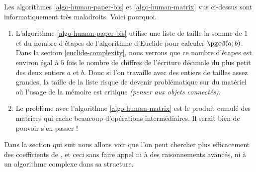 Les algorithmes \ref{algo-human-paper-bis} et \ref{algo-human-matrix} vus ci-dessus sont informatiquement très maladroits. Voici pourquoi.

\begin{enumerate}
	\item L'algorithme \ref{algo-human-paper-bis} utilise une liste de taille la somme de $1$ et du nombre d'étapes de l'algo\-rithme d'Euclide pour calculer $\pgcd(a ; b)$.
	Dans la section \ref{euclide-complexity}, nous verrons que ce nombre d'étapes est environ égal à $5$ fois le nombre de chiffres de l'écriture décimale du plus petit des deux entiers $a$ et $b$.
	Donc si l'on travaille avec des entiers de tailles assez grandes, la taille de la liste risque de devenir problématique sur du matériel où l'usage de la mémoire est critique \emph{(penser aux objets connectés)}.


	\item Le problème avec l'algorithme \ref{algo-human-matrix} est le produit cumulé des matrices qui cache beaucoup d'opérations intermédiaires. Il serait bien de pouvoir s'en passer !
\end{enumerate}

Dans la section qui suit nous allons voir que l'on peut chercher plus efficacement des coefficients de \bb{}, et ceci sans faire appel ni à des raisonnements avancés, ni à un algorithme complexe dans sa structure.
